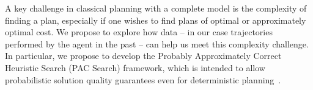 \documentclass[12pt]{article}
\begin{document}
A key challenge in classical planning with a complete model is the complexity of finding a plan, especially if one wishes to find plans of optimal or approximately optimal cost. We propose to explore how data -- in our case trajectories performed by the agent in the past -- can help us meet this complexity challenge. %
In particular, we propose to develop the Probably Approximately Correct Heuristic Search (PAC Search) framework, which is intended to allow probabilistic solution quality guarantees even for deterministic planning~\cite{stern2011probably,stern2012search}. %
\end{document}
